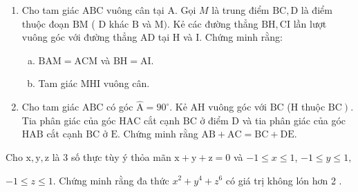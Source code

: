 \begin{bt}
    \hfill
    \begin{enumerate}[1)]
        \item Cho tam giác $\mathrm{ABC}$ vuông cân tại $\mathrm{A}$. Gọi $M$ là trung điểm $\mathrm{BC}, \mathrm{D}$ là điểm thuộc đoạn $\mathrm{BM}$ ( $\mathrm{D}$ khác $\mathrm{B}$ và $\mathrm{M})$. Kẻ các đường thẳng $\mathrm{BH}, \mathrm{CI}$ lần lượt vuông góc với đường thẳng $\mathrm{AD}$ tại $\mathrm{H}$ và $\mathrm{I}$. Chứng minh rằng:
        \begin{enumerate}[a.]
            \item $\mathrm{BAM}=\mathrm{ACM}$ và $\mathrm{BH}=\mathrm{AI}$.
            \item Tam giác MHI vuông cân.
        \end{enumerate}
        \item Cho tam giác $\mathrm{ABC}$ có góc $\widehat{\mathrm{A}}=90^{\circ}$. Kẻ $\mathrm{AH}$ vuông góc với $\mathrm{BC}$ (H thuộc $\left.\mathrm{BC}\right)$. Tia phân giác của góc $\mathrm{HAC}$ cắt cạnh $\mathrm{BC}$ ở điểm $\mathrm{D}$ và tia phân giác của góc $\mathrm{HAB}$ cắt cạnh $\mathrm{BC}$ ở $\mathrm{E}$. Chứng minh rằng $\mathrm{AB}+\mathrm{AC}=\mathrm{BC}+\mathrm{DE}$.
    \end{enumerate}
	\loigiai{}
\end{bt}

\begin{bt}
    Cho $\mathrm{x}, \mathrm{y}, \mathrm{z}$ là 3 số thực tùy ý thỏa mãn $\mathrm{x}+\mathrm{y}+\mathrm{z}=0$ và $-1 \leq x \leq 1$, $-1 \leq y \leq 1,$
    
    $-1 \leq z \leq 1$. Chứng minh rằng đa thức $x^2+y^4+z^6$ có giá trị không lón hơn 2 .
\loigiai{}
\end{bt}



